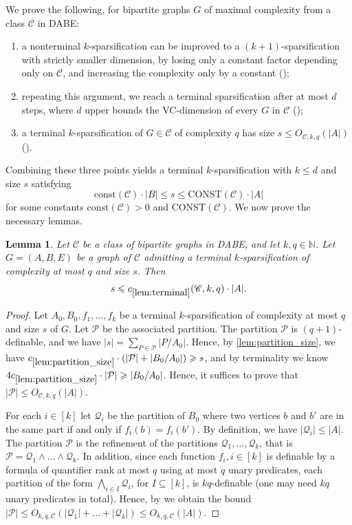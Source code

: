 \documentclass[11pt]{article}
\newtheorem{lemma}[theorem]{Lemma}
\theoremstyle{definition}
\newcommand{\CC}{{\mathscr C}}
\newcommand{\N}{\mathbb{N}}
\newcommand{\inducedSS}[2]{#1/#2}%
\renewcommand{\le}{\leqslant}
\renewcommand{\ge}{\geqslant}
\newcommand{\Pp}{\mathcal{P}}
\newcommand{\Qq}{\mathcal{Q}}
\begin{document}
We prove the following, for bipartite graphs $G$ of maximal complexity from a class $\CC$ in DABE:
\begin{enumerate}
  \item a nonterminal $k$-sparsification can be improved to a $(k+1)$-sparsification with strictly smaller dimension, by losing only a constant factor depending only on $\CC$, and increasing the complexity only by a constant ();
  \item repeating this argument, we reach a terminal sparsification after at most $d$ steps, where $d$ upper bounds the VC-dimension of every $G$ in $\CC$ ();
  \item  a terminal $k$-sparsification of $G\in \CC$ of complexity $q$ has size $s\le O_{\CC, k, q}(|A|)$ ().
\end{enumerate}
Combining these three points yields a terminal $k$-sparsification with $k\le d$ and size $s$ satisfying
\[
\text{const}(\CC) \cdot |B| \le s \le \text{CONST}(\CC) \cdot |A|
\]
for some constants $\text{const}(\CC) > 0$ and $\text{CONST}(\CC)$.
We now prove the necessary lemmas.

\begin{lemma}\label{lem:terminal}
  Let $\CC$ be a class of bipartite graphs in DABE, and let $k,q\in\N$.
  Let $G=(A,B,E)$ be a graph of $\CC$ admitting a terminal $k$-sparsification of complexity at most $q$ and size $s$.
  Then
  \[
    s\le c_{\ref{lem:terminal}}(\CC, k, q) \cdot |A|.
  \]
\end{lemma}
\begin{proof}
Let $A_0, B_0, f_1, \dots, f_k$ be a terminal $k$-sparsification of complexity at most $q$ and size $s$ of $G$. Let $\Pp$ be the associated partition.
The partition $\Pp$ is $(q+1)$-definable, and we have $|s| = \sum_{P \in \Pp} |\inducedSS{P}{A_0}|$.
Hence, by \cref{lem:partition_size}, we have $c_{\ref{lem:partition_size}}\cdot (|\Pp| + |\inducedSS{B_0}{A_0}|) \ge s$, and by terminality we know $4 c_{\ref{lem:partition_size}} \cdot |\Pp| \ge |\inducedSS{B_0}{A_0}|$. Hence, it suffices to prove that $|\Pp|\le O_{\CC, k, q}(|A|)$.

For each $i \in [k]$ let $\Qq_i$ be the partition of $B_0$ where two vertices $b$ and $b'$ are in the same part if and only if $f_i(b) = f_i(b')$.
By definition, we have $|\Qq_i| \le |A|$.
The partition $\Pp$ is the refinement of the partitions $\Qq_1, \dots, \Qq_k$, that is $\Pp = \Qq_1 \wedge \dots \wedge \Qq_k$.
In addition, since each function $f_i, i \in [k]$ is definable by a formula of quantifier rank at most $q$ using at most $q$ unary predicates, each partition of the form $\bigwedge_{i \in I} \Qq_i$, for $I \subseteq [k]$, is $kq$-definable (one may need $kq$ unary predicates in total).
Hence, by  we obtain the bound $|\Pp| \le O_{k, q, \CC} (|\Qq_1| + \dots + |\Qq_k|) \le O_{k, q, \CC}(|A|)$.
\end{proof}
\end{document}
